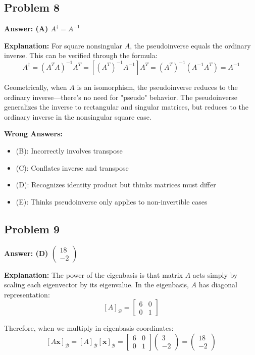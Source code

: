 \documentclass[12pt]{amsart}
\newcommand{\correct}[1]{{\color{correctgreen}\textbf{#1}}}
\begin{document}
{\subsection*{Problem 8}
\correct{Answer: (A) $A^{\dagger} = A^{-1}$}

\textbf{Explanation:} For square nonsingular $A$, the pseudoinverse equals the ordinary inverse. This can be verified through the formula:
$$A^{\dagger} = (A^TA)^{-1}A^T = [(A^T)^{-1}A^{-1}]A^T = (A^T)^{-1}(A^{-1}A^T) = A^{-1}$$

Geometrically, when $A$ is an isomorphism, the pseudoinverse reduces to the ordinary inverse—there's no need for "pseudo" behavior. The pseudoinverse generalizes the inverse to rectangular and singular matrices, but reduces to the ordinary inverse in the nonsingular square case.

\textbf{Wrong Answers:}
\begin{itemize}
\item (B): Incorrectly involves transpose
\item (C): Conflates inverse and transpose
\item (D): Recognizes identity product but thinks matrices must differ
\item (E): Thinks pseudoinverse only applies to non-invertible cases
\end{itemize}

\subsection*{Problem 9}
\correct{Answer: (D) $\begin{pmatrix} 18 \\ -2 \end{pmatrix}$}

\textbf{Explanation:} The power of the eigenbasis is that matrix $A$ acts simply by scaling each eigenvector by its eigenvalue. In the eigenbasis, $A$ has diagonal representation:
$$[A]_{\mathcal{B}} = \begin{bmatrix} 6 & 0 \\ 0 & 1 \end{bmatrix}$$

Therefore, when we multiply in eigenbasis coordinates:
$$[A\mathbf{x}]_{\mathcal{B}} = [A]_{\mathcal{B}}[\mathbf{x}]_{\mathcal{B}} = \begin{bmatrix} 6 & 0 \\ 0 & 1 \end{bmatrix}\begin{pmatrix} 3 \\ -2 \end{pmatrix} = \begin{pmatrix} 18 \\ -2 \end{pmatrix}$$

}
\end{document}
